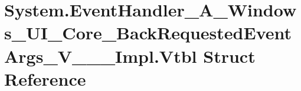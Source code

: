 \hypertarget{struct_system_1_1_event_handler___a___windows___u_i___core___back_requested_event_args___v_______impl_1_1_vtbl}{}\section{System.\+Event\+Handler\+\_\+\+A\+\_\+\+Windows\+\_\+\+U\+I\+\_\+\+Core\+\_\+\+Back\+Requested\+Event\+Args\+\_\+\+V\+\_\+\+\_\+\+\_\+\+Impl.\+Vtbl Struct Reference}
\label{struct_system_1_1_event_handler___a___windows___u_i___core___back_requested_event_args___v_______impl_1_1_vtbl}
